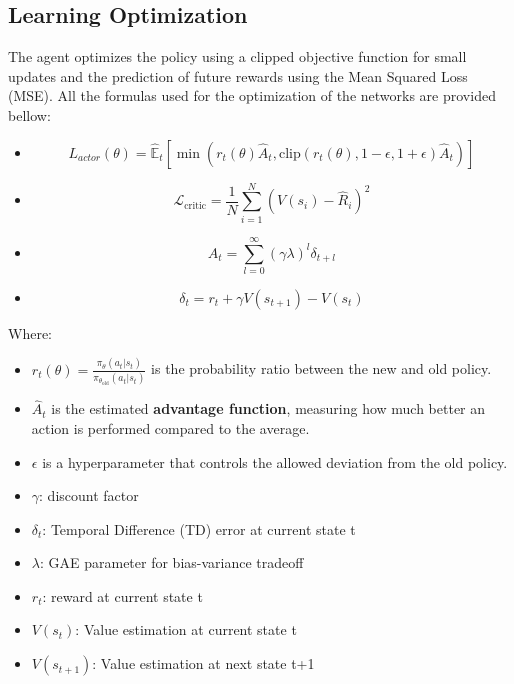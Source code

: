 \documentclass{article}
\begin{document}
\subsection{Learning Optimization}
The agent optimizes the policy using a clipped objective function for small updates and the prediction of future rewards using the Mean Squared Loss (MSE).
All the formulas used for the optimization of the networks are provided bellow:
\begin{itemize}
\item \begin{equation}
L_{actor}(\theta) = \hat{\mathbb{E}}_t \left[ \min\left( r_t(\theta)\hat{A}_t, \text{clip}(r_t(\theta), 1 - \epsilon, 1 + \epsilon) \hat{A}_t \right) \right]
\end{equation}

\item \begin{equation}
\mathcal{L}_{\text{critic}} = \frac{1}{N} \sum_{i=1}^{N} \left( V(s_i) - \hat{R}_i \right)^2
\end{equation}

\item \begin{equation}
A_t = \sum_{l=0}^{\infty} (\gamma \lambda)^l \delta_{t+l}
\end{equation}

\item \begin{equation}
\delta_t = r_t + \gamma V(s_{t+1}) - V(s_t)
\end{equation}

\end{itemize}

Where:
\begin{itemize}
    \item \( r_t(\theta) = \frac{\pi_\theta(a_t | s_t)}{\pi_{\theta_{\text{old}}}(a_t | s_t)} \) is the probability ratio between the new and old policy.
    \item \( \hat{A}_t \) is the estimated \textbf{advantage function}, measuring how much better an action is performed compared to the average.
    \item \( \epsilon \) is a hyperparameter that controls the allowed deviation from the old policy.
    \item $\gamma$: discount factor
    \item $\delta_t$: Temporal Difference (TD) error at current state t
    \item $\lambda$: GAE parameter for bias-variance tradeoff
    \item $r_t$: reward at current state t
    \item $V(s_t)$: Value estimation at current state t
    \item $V(s_{t+1})$: Value estimation at next state t+1
\end{itemize}
\end{document}
